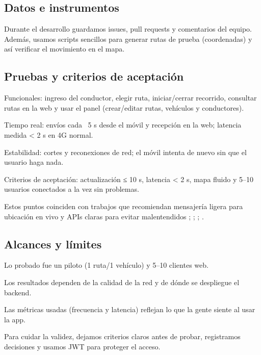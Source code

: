 \subsection{Datos e instrumentos}
Durante el desarrollo guardamos issues, pull requests y comentarios del equipo. Además, usamos scripts sencillos para generar rutas de prueba (coordenadas) y así verificar el movimiento en el mapa.

\subsection{Pruebas y criterios de aceptación}
Funcionales: ingreso del conductor, elegir ruta, iniciar/cerrar recorrido, consultar rutas en la web y usar el panel (crear/editar rutas, vehículos y conductores).

Tiempo real: envíos cada ~5 s desde el móvil y recepción en la web; latencia medida < 2 s en 4G normal.

Estabilidad: cortes y reconexiones de red; el móvil intenta de nuevo sin que el usuario haga nada.

Criterios de aceptación: actualización ≤ 10 s, latencia < 2 s, mapa fluido y 5–10 usuarios conectados a la vez sin problemas.

Estos puntos coinciden con trabajos que recomiendan mensajería ligera para ubicación en vivo y APIs claras para evitar malentendidos \cite{cityruta2018}; \cite{stopbus2016}; \cite{sismo2016}; \cite{easyrest2022}.

\subsection{Alcances y límites}
Lo probado fue un piloto (1 ruta/1 vehículo) y 5–10 clientes web.

Los resultados dependen de la calidad de la red y de dónde se despliegue el backend.

Las métricas usadas (frecuencia y latencia) reflejan lo que la gente siente al usar la app.

Para cuidar la validez, dejamos criterios claros antes de probar, registramos decisiones y usamos JWT para proteger el acceso.